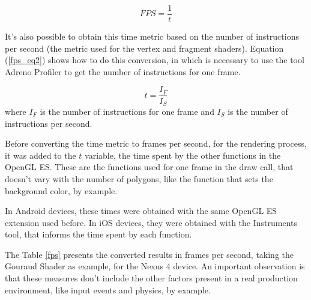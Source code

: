 \documentclass[10pt, conference, compsocconf]{IEEEtran}
\begin{document}
	\begin{equation}
		FPS = \frac{1} {t}
	\label{fps_eq}
	\end{equation}
	
It's also possible to obtain this time metric based on the number of instructions
per second (the metric used for the vertex and fragment shaders). Equation (\ref{fps_eq2}) shows how to do this conversion, in which is necessary
to use the tool Adreno Profiler to get the number of instructions for one
frame.

	\begin{equation}
		t = \frac{I_F} {I_S}
	\label{fps_eq2}
	\end{equation}
	where $I_{F}$ is the number of instructions for one frame and 
$I_{S}$  is the number of instructions per second.

Before converting the time metric to frames per second, for the rendering process,
it was added to the $t$ variable, the time spent by the other functions
in the OpenGL ES. These are the functions used for one frame in the draw call,
that doesn't vary with the number of polygons, like the function that sets the
background color, by example. 

In Android devices, these times were 
obtained with the same OpenGL ES extension used before. In iOS devices, they
were obtained with the Instruments tool, that informs the time spent by
each function.

The Table \ref{fps} presents the converted results in frames per second, 
taking the Gouraud Shader as example, for the Nexus 4 device. An important
observation is that these measures don't include the other factors present
in a real production environment, like input events and physics, by example.
\end{document}
